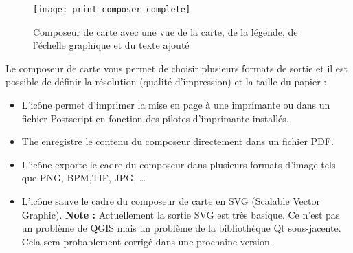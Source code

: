 \begin{figure}[h]
   \begin{center}
\caption{Composeur de carte avec une vue de la carte, de la légende, de
l'échelle graphique et du texte ajouté
\nixcaption}
   \label{fig:print_composer_complete}\smallskip
   \texttt{[image: print\_composer\_complete]}
\end{center}
\end{figure}

Le composeur de carte vous permet de choisir plusieurs formats de sortie et il est possible de définir la résolution (qualité d'impression) et la taille du papier :

\begin{itemize}
\item L'icône   permet d'imprimer la mise en page à une imprimante ou dans un fichier Postscript en fonction des pilotes d'imprimante installés.
\item The  enregistre le contenu du composeur directement dans un fichier PDF.
\item L'icône  exporte le cadre du composeur dans plusieurs formats d'image tels que PNG, BPM,TIF, JPG, \dots

\item L'icône  sauve le cadre du composeur de carte en SVG (Scalable Vector Graphic). \textbf{Note :} Actuellement la sortie SVG est très basique. Ce n'est pas un problème de QGIS mais un problème de la bibliothèque Qt sous-jacente. Cela sera
probablement corrigé dans une prochaine version. \end{itemize}

